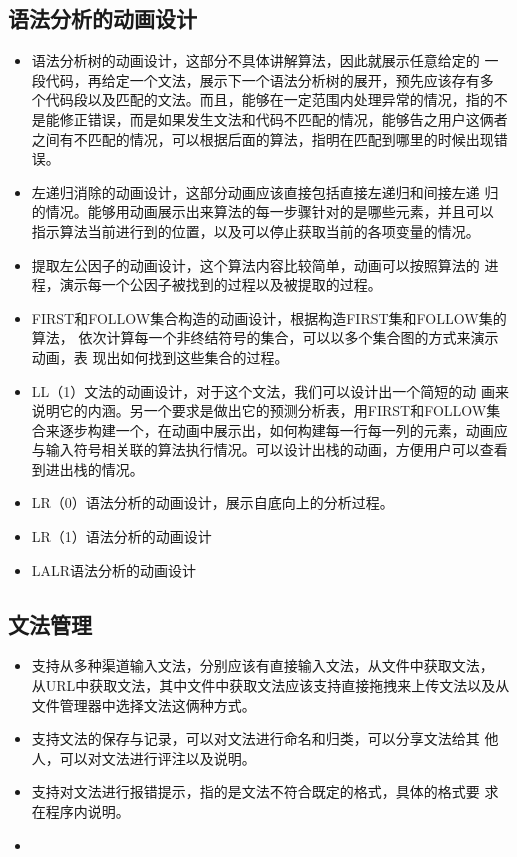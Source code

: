 \subsection{语法分析的动画设计}
\begin{itemize}
\item 语法分析树的动画设计，这部分不具体讲解算法，因此就展示任意给定的
  一段代码，再给定一个文法，展示下一个语法分析树的展开，预先应该存有多
  个代码段以及匹配的文法。而且，能够在一定范围内处理异常的情况，指的不
  是能修正错误，而是如果发生文法和代码不匹配的情况，能够告之用户这俩者
  之间有不匹配的情况，可以根据后面的算法，指明在匹配到哪里的时候出现错
  误。
\item 左递归消除的动画设计，这部分动画应该直接包括直接左递归和间接左递
  归的情况。能够用动画展示出来算法的每一步骤针对的是哪些元素，并且可以
  指示算法当前进行到的位置，以及可以停止获取当前的各项变量的情况。
\item 提取左公因子的动画设计，这个算法内容比较简单，动画可以按照算法的
  进程，演示每一个公因子被找到的过程以及被提取的过程。
\item FIRST和FOLLOW集合构造的动画设计，根据构造FIRST集和FOLLOW集的算法，
  依次计算每一个非终结符号的集合，可以以多个集合图的方式来演示动画，表
  现出如何找到这些集合的过程。
\item LL（1）文法的动画设计，对于这个文法，我们可以设计出一个简短的动
  画来说明它的内涵。另一个要求是做出它的预测分析表，用FIRST和FOLLOW集
  合来逐步构建一个，在动画中展示出，如何构建每一行每一列的元素，动画应
  与输入符号相关联的算法执行情况。可以设计出栈的动画，方便用户可以查看
  到进出栈的情况。
\item LR（0）语法分析的动画设计，展示自底向上的分析过程。
\item LR（1）语法分析的动画设计
\item LALR语法分析的动画设计
\end{itemize}
\subsection{文法管理}
\begin{itemize}
\item 支持从多种渠道输入文法，分别应该有直接输入文法，从文件中获取文法，
  从URL中获取文法，其中文件中获取文法应该支持直接拖拽来上传文法以及从
  文件管理器中选择文法这俩种方式。
\item 支持文法的保存与记录，可以对文法进行命名和归类，可以分享文法给其
  他人，可以对文法进行评注以及说明。
\item 支持对文法进行报错提示，指的是文法不符合既定的格式，具体的格式要
  求在程序内说明。
\item 
\end{itemize}